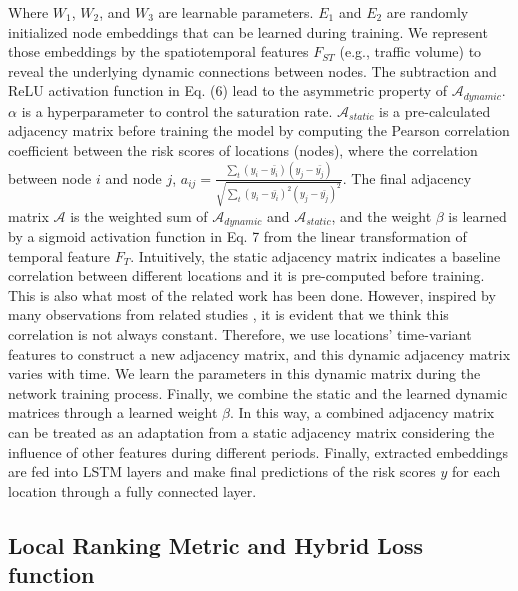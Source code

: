 \documentclass{article}
\def \A {\mathcal{A}}
\def \A {\mathcal{A}}
\begin{document}
Where $W_1$, $W_2$, and $W_3$ are learnable parameters. $E_1$ and $E_2$ are randomly initialized node embeddings that can be learned during training. We represent those embeddings by the spatiotemporal features $F_{ST}$ (e.g., traffic volume) to reveal the underlying dynamic connections between nodes. The subtraction and ReLU activation function in Eq. (6) lead to the asymmetric property of $\A_{dynamic}$. $\alpha$ is a hyperparameter to control the saturation rate. $\A_{static}$ is a pre-calculated adjacency matrix before training the model by computing the Pearson correlation coefficient between the risk scores of locations (nodes), where the correlation between node $i$ and node $j$, $a_{ij}= \frac{\sum_t (y_i - \bar{y_i})(y_j - \bar{y_j})}{\sqrt{\sum_t (y_i - \bar{y_i})^2(y_j - \bar{y_j})^2}}$. The final adjacency matrix $\A$ is the weighted sum of $\A_{dynamic}$ and $\A_{static}$, and the weight $\beta$ is learned by a sigmoid activation function in Eq. 7 from the linear transformation of temporal feature $F_T$. Intuitively, the static adjacency matrix indicates a baseline correlation between different locations and it is pre-computed before training. This is also what most of the related work has been done. However, inspired by many observations from related studies \cite{Careye014319}\cite{yuan2018hetero}, it is evident that we think this correlation is not always constant. Therefore, we use locations’ time-variant features to construct a new adjacency matrix, and this dynamic adjacency matrix varies with time. We learn the parameters in this dynamic matrix during the network training process. Finally, we combine the static and the learned dynamic matrices through a learned weight $\beta$. In this way, a combined adjacency matrix can be treated as an adaptation from a static adjacency matrix considering the influence of other features during different periods. %
Finally, extracted embeddings are fed into LSTM layers and make final predictions of the risk scores $y$ for each location through a fully connected layer.

\subsection{Local Ranking Metric and Hybrid Loss function}
\end{document}
